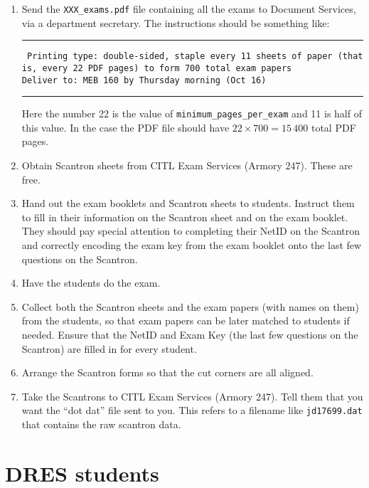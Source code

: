 \documentclass{article}
\begin{document}
\begin{enumerate}
\item Send the \texttt{XXX_exams.pdf} file
  containing all the exams to Document Services, via a department
  secretary. The instructions should be something like:

  \rule{\linewidth}{0.5pt}

  \parbox{\linewidth}{
    \tt
    Printing type: double-sided, staple every 11 sheets of paper (that is, every 22 PDF pages) to form 700 total exam papers \\
    Deliver to: MEB 160 by Thursday morning (Oct 16)
  }

  \rule{\linewidth}{0.5pt}

  Here the number 22 is the value of \texttt{minimum_pages_per_exam} and
  11 is half of this value. In the case the PDF file should have $22
  \times 700 = 15\,400$ total PDF pages.
\item Obtain Scantron sheets from CITL Exam Services (Armory
  247). These are free.
\item Hand out the exam booklets and Scantron sheets to
  students. Instruct them to fill in their information on the Scantron
  sheet and on the exam booklet. They should pay special attention to
  completing their NetID on the Scantron and correctly encoding the
  exam key from the exam booklet onto the last few questions on the
  Scantron.
\item Have the students do the exam.
\item Collect both the Scantron sheets and the exam papers (with names
  on them) from the students, so that exam papers can be later matched
  to students if needed. Ensure that the NetID and Exam Key (the last
  few questions on the Scantron) are filled in for every student.
\item Arrange the Scantron forms so that the cut corners are all
  aligned.
\item Take the Scantrons to CITL Exam Services (Armory 247). Tell them
  that you want the ``dot dat'' file sent to you. This refers to a
  filename like \texttt{jd17699.dat} that contains the raw scantron
  data.
\end{enumerate}

\section{DRES students}
\end{document}
